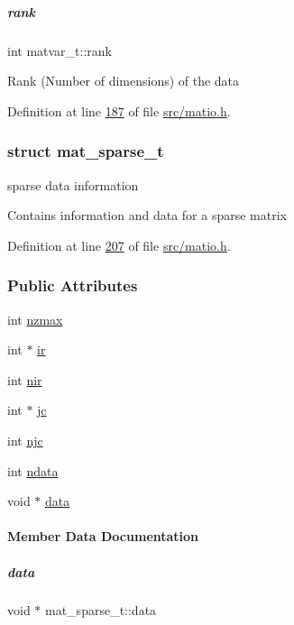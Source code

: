\mbox{\label{group___m_a_t_a84ba70c96ded13cc555fa75b768d9921}} 
\subparagraph{\texorpdfstring{rank}{rank}}
{\footnotesize\ttfamily int matvar\+\_\+t\+::rank}

Rank (Number of dimensions) of the data 

Definition at line \hyperlink{src_2matio_8h_source_l00187}{187} of file \hyperlink{src_2matio_8h_source}{src/matio.\+h}.

\label{structmat__sparse__t}
\subsubsection{struct mat\+\_\+sparse\+\_\+t}
sparse data information 

Contains information and data for a sparse matrix 

Definition at line \hyperlink{src_2matio_8h_source_l00207}{207} of file \hyperlink{src_2matio_8h_source}{src/matio.\+h}.

\subsubsection*{Public Attributes}
\begin{DoxyCompactItemize}
\item 
int \hyperlink{group___m_a_t_ad79471861cb948e32671be6d4089173a}{nzmax}
\item 
int $\ast$ \hyperlink{group___m_a_t_a8d4c863d704edddec5cbfa15b2d719c8}{ir}
\item 
int \hyperlink{group___m_a_t_aa64636ad57cf87f7a28ff5018437a850}{nir}
\item 
int $\ast$ \hyperlink{group___m_a_t_ad1e74cdc4f7eff1e47a670297c01da4b}{jc}
\item 
int \hyperlink{group___m_a_t_a482d8e4b40aa975f0c1daf146ebe08a4}{njc}
\item 
int \hyperlink{group___m_a_t_a1beb8a8c58a808207cbea650563a9b63}{ndata}
\item 
void $\ast$ \hyperlink{group___m_a_t_ae2c648cb9eac4ce47f26cddb44246152}{data}
\end{DoxyCompactItemize}


\paragraph{Member Data Documentation}
\mbox{\label{group___m_a_t_ae2c648cb9eac4ce47f26cddb44246152}} 
\subparagraph{\texorpdfstring{data}{data}}
{\footnotesize\ttfamily void $\ast$ mat\+\_\+sparse\+\_\+t\+::data}

